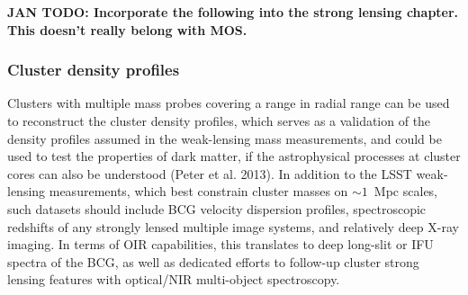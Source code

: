 



{\bf  JAN TODO: Incorporate the following into the strong lensing chapter.  This doesn't really belong with MOS.}
\subsubsection{Cluster density profiles}

Clusters with multiple mass probes covering a range in radial range can be used to reconstruct the cluster density profiles, which serves as a validation of the density profiles assumed in the weak-lensing mass measurements, and could be used to test the properties of dark matter, if the astrophysical processes at cluster cores can also be understood (Peter et al. 2013).  In addition to the LSST weak-lensing measurements, which best constrain cluster masses on $\sim1$~Mpc scales, such datasets should include BCG velocity dispersion profiles, spectroscopic redshifts of any strongly lensed multiple image systems, and relatively deep X-ray imaging. In terms of OIR capabilities, this translates to deep long-slit or IFU spectra of the BCG, as well as dedicated efforts to follow-up cluster strong lensing features with optical/NIR multi-object spectroscopy.  %

